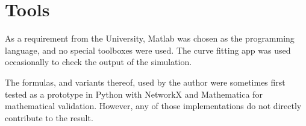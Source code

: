 
\section{Tools}
As a requirement from the University, Matlab was chosen as the programming language, and no special toolboxes were used.
The curve fitting app was used occasionally to check the output of the simulation.

The formulas, and variants thereof, used by the author were sometimes first tested as a prototype in Python with NetworkX and Mathematica for mathematical validation. However, any of those implementations do not directly contribute to the result.
